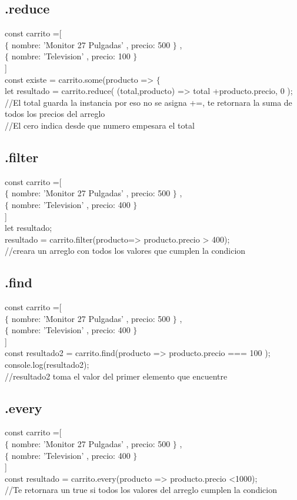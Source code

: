 \documentclass[10pt,a4paper]{article}
\begin{document}
\subsection{.reduce} 
const carrito =[ \\ $ \{ $ nombre: 'Monitor 27 Pulgadas' , precio: 500 $ \} $ , \\ $ \{ $ nombre: 'Television' , precio: 100 $ \} $  \\ ]  \\
const existe = carrito.some(producto => $\{$ \\ 
let resultado =  carrito.reduce( (total,producto) => total +producto.precio, 0 );\\
//El total guarda la instancia por eso no se asigna +=, te retornara la suma de todos los precios del arreglo \\ 
//El cero indica desde que numero empesara el total\\
\subsection{.filter} 
const carrito =[ \\ $ \{ $ nombre: 'Monitor 27 Pulgadas' , precio: 500 $ \} $ , \\ $ \{ $ nombre: 'Television' , precio: 400 $ \} $  \\ ]  \\
let resultado;\\
resultado = carrito.filter(producto=> producto.precio > 400); \\
//creara un arreglo con todos los valores que cumplen la condicion \\
\subsection{.find} 
const carrito =[ \\ $ \{ $ nombre: 'Monitor 27 Pulgadas' , precio: 500 $ \} $ , \\ $ \{ $ nombre: 'Television' , precio: 400 $ \} $  \\ ]  \\
const resultado2 = carrito.find(producto => producto.precio === 100 );\\
console.log(resultado2);\\
//resultado2 toma el valor del primer elemento que encuentre\\

\newpage
\subsection{.every} 
const carrito =[ \\ $ \{ $ nombre: 'Monitor 27 Pulgadas' , precio: 500 $ \} $ , \\ $ \{ $ nombre: 'Television' , precio: 400 $ \} $  \\ ]  \\
const resultado = carrito.every(producto => producto.precio <1000);\\
//Te retornara un true si todos los valores del arreglo cumplen la condicion\\ 
\end{document}
